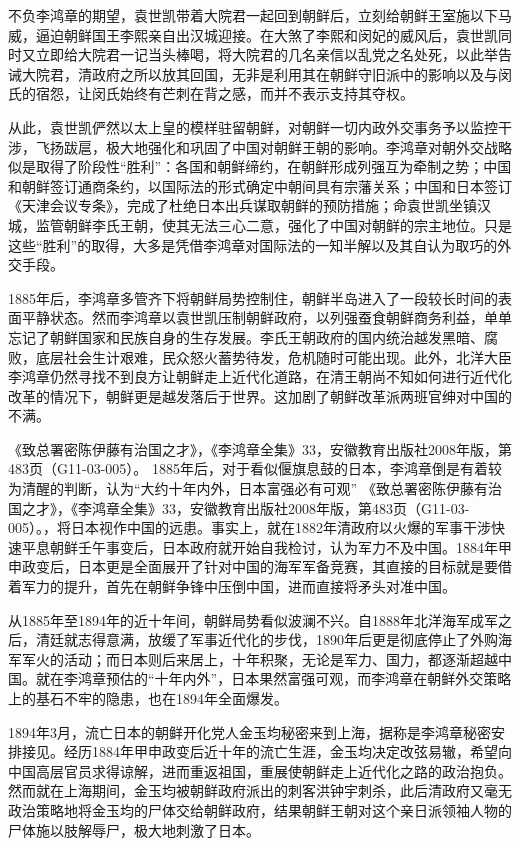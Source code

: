 \documentclass[12pt,UTF8]{ctexbook}
\begin{document}
不负李鸿章的期望，袁世凯带着大院君一起回到朝鲜后，立刻给朝鲜王室施以下马威，逼迫朝鲜国王李熙亲自出汉城迎接。在大煞了李熙和闵妃的威风后，袁世凯同时又立即给大院君一记当头棒喝，将大院君的几名亲信以乱党之名处死，以此举告诫大院君，清政府之所以放其回国，无非是利用其在朝鲜守旧派中的影响以及与闵氏的宿怨，让闵氏始终有芒刺在背之感，而并不表示支持其夺权。

从此，袁世凯俨然以太上皇的模样驻留朝鲜，对朝鲜一切内政外交事务予以监控干涉，飞扬跋扈，极大地强化和巩固了中国对朝鲜王朝的影响。李鸿章对朝外交战略似是取得了阶段性“胜利”：各国和朝鲜缔约，在朝鲜形成列强互为牵制之势；中国和朝鲜签订通商条约，以国际法的形式确定中朝间具有宗藩关系；中国和日本签订《天津会议专条》，完成了杜绝日本出兵谋取朝鲜的预防措施；命袁世凯坐镇汉城，监管朝鲜李氏王朝，使其无法三心二意，强化了中国对朝鲜的宗主地位。只是这些“胜利”的取得，大多是凭借李鸿章对国际法的一知半解以及其自认为取巧的外交手段。

1885年后，李鸿章多管齐下将朝鲜局势控制住，朝鲜半岛进入了一段较长时间的表面平静状态。然而李鸿章以袁世凯压制朝鲜政府，以列强蚕食朝鲜商务利益，单单忘记了朝鲜国家和民族自身的生存发展。李氏王朝政府的国内统治越发黑暗、腐败，底层社会生计艰难，民众怒火蓄势待发，危机随时可能出现。此外，北洋大臣李鸿章仍然寻找不到良方让朝鲜走上近代化道路，在清王朝尚不知如何进行近代化改革的情况下，朝鲜更是越发落后于世界。这加剧了朝鲜改革派两班官绅对中国的不满。

《致总署密陈伊藤有治国之才》，《李鸿章全集》33，安徽教育出版社2008年版，第483页（G11-03-005）。
1885年后，对于看似偃旗息鼓的日本，李鸿章倒是有着较为清醒的判断，认为“大约十年内外，日本富强必有可观” 《致总署密陈伊藤有治国之才》，《李鸿章全集》33，安徽教育出版社2008年版，第483页（G11-03-005）。，将日本视作中国的远患。事实上，就在1882年清政府以火爆的军事干涉快速平息朝鲜壬午事变后，日本政府就开始自我检讨，认为军力不及中国。1884年甲申政变后，日本更是全面展开了针对中国的海军军备竞赛，其直接的目标就是要借着军力的提升，首先在朝鲜争锋中压倒中国，进而直接将矛头对准中国。

从1885年至1894年的近十年间，朝鲜局势看似波澜不兴。自1888年北洋海军成军之后，清廷就志得意满，放缓了军事近代化的步伐，1890年后更是彻底停止了外购海军军火的活动；而日本则后来居上，十年积聚，无论是军力、国力，都逐渐超越中国。就在李鸿章预估的“十年内外”，日本果然富强可观，而李鸿章在朝鲜外交策略上的基石不牢的隐患，也在1894年全面爆发。

1894年3月，流亡日本的朝鲜开化党人金玉均秘密来到上海，据称是李鸿章秘密安排接见。经历1884年甲申政变后近十年的流亡生涯，金玉均决定改弦易辙，希望向中国高层官员求得谅解，进而重返祖国，重展使朝鲜走上近代化之路的政治抱负。然而就在上海期间，金玉均被朝鲜政府派出的刺客洪钟宇刺杀，此后清政府又毫无政治策略地将金玉均的尸体交给朝鲜政府，结果朝鲜王朝对这个亲日派领袖人物的尸体施以肢解辱尸，极大地刺激了日本。
\end{document}
